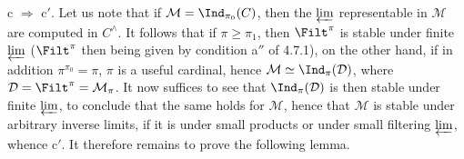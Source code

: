 c $\Longrightarrow$ c$'$. Let us note that if $\mathcal{M}=\Ind_{\pi_0}(C)$, then the $\varprojlim$ representable in $\mathcal{M}$ are computed in $C^\wedge$. It follows that if $\pi\geqslant\pi_1$, then $\Filt^\pi$ is stable under finite $\varprojlim$ ($\Filt^\pi$ then being given by condition a$''$ of 4.7.1), on the other hand, if in addition $\pi^{\pi_0}=\pi$, $\pi$ is a useful cardinal, hence $\mathcal{M}\simeq\Ind_\pi(\mathcal{D})$, where $\mathcal{D}=\Filt^\pi=\mathcal{M}_\pi$. It now suffices to see that $\Ind_\pi(\mathcal{D})$ is then stable under finite $\varprojlim$, to conclude that the same holds for $\mathcal{M}$, hence that $\mathcal{M}$ is stable under arbitrary inverse limits, if it is under small products or under small filtering $\varprojlim$, whence c$'$. It therefore remains to prove the following lemma. %